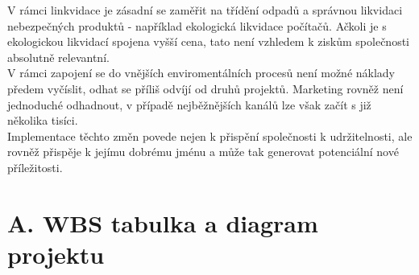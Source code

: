 V rámci linkvidace je zásadní se zaměřit na třídění odpadů a správnou likvidaci nebezpečných produktů - například ekologická likvidace počítačů. Ačkoli je s ekologickou likvidací spojena vyšší cena, tato není vzhledem k ziskům společnosti absolutně relevantní.\\

V rámci zapojení se do vnějších enviromentálních procesů není možné náklady předem vyčíslit, odhat se příliš odvíjí od druhů projektů. Marketing rovněž není jednoduché odhadnout, v případě nejběžnějších kanálů lze však začít s již několika tisíci.\\

Implementace těchto změn povede nejen k přispění společnosti k udržitelnosti, ale rovněž přispěje k jejímu dobrému jménu a může tak generovat potenciální nové příležitosti.\\

\newpage

\section*{A. WBS tabulka a diagram projektu}
\label{sec:WBS}

